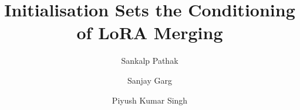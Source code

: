 %
%
\documentclass[preprint,12pt,authoryear]{elsarticle}






\begin{frontmatter}

\title{Initialisation Sets the Conditioning of LoRA Merging}

\author[jiet]{Sankalp Pathak}
\author[jiet]{Sanjay Garg}
\author[jiet]{Piyush Kumar Singh}

\begin{abstract}

\end{abstract}

\begin{highlights}

\end{highlights}

\begin{keyword}
LoRA \sep model merging \sep parameter-efficient fine-tuning \sep
initialisation \sep conditioning \sep pre-registration
\end{keyword}

\end{frontmatter}

\def\FrontmatterAlreadySet{}






